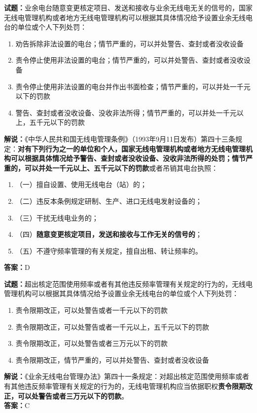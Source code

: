 \documentclass{ctexbook}
\begin{document}
\noindent\textbf{试题：}业余电台随意变更核定项目、发送和接收与业余无线电无关的信号的，国家无线电管理机构或者地方无线电管理机构可以根据其具体情况给予设置业余无线电台的单位或个人下列处罚：
\begin{enumerate}[leftmargin=3em]
  \item 劝告拆除非法设置的电台；情节严重的，可以并处警告、查封或者没收设备
  \item 责令停止使用非法设置的电台；情节严重的，可以并处警告、查封或者没收设备
  \item 责令停止使用非法设置的电台并作出书面检查；情节严重的，可以并处一千元以下的罚款
  \item 警告、查封或者没收设备、没收非法所得；情节严重的，可以并处一千元以上，五千元以下的罚款
\end{enumerate}
\noindent\textbf{解说：}《中华人民共和国无线电管理条例》（1993年9月11日发布）第四十三条规定：\textbf{对有下列行为之一的单位和个人，国家无线电管理机构或者地方无线电管理机构可以根据具体情况给予警告、查封或者没收设备、没收非法所得的处罚；情节严重的，可以并处一千元以上、五千元以下的罚款}或者吊销其电台执照：
\begin{enumerate}[leftmargin=3em, label=]
  \item（一）擅自设置、使用无线电台（站）的；
  \item（二）违反本条例规定研制、生产、进口无线电发射设备的；
  \item（三）干扰无线电业务的；
  \item（四）\textbf{随意变更核定项目，发送和接收与工作无关的信号的}；
  \item（五）不遵守频率管理的有关规定，擅自出租、转让频率的。
\end{enumerate}
\textbf{答案：}D

\bigskip

\noindent\textbf{试题：}超出核定范围使用频率或者有其他违反频率管理有关规定的行为的，无线电管理机构可以根据其具体情况给予设置业余无线电台的单位或个人下列处罚：
\begin{enumerate}[leftmargin=3em]
  \item 责令限期改正，可以处警告或者一千元以下的罚款
  \item 责令限期改正，可以处警告或者一千元以上，五千元以下的罚款
  \item 责令限期改正，可以处警告或者三万元以下的罚款
  \item 责令限期改正，情节严重的，可以并处警告、查封或者没收设备
\end{enumerate}
\noindent\textbf{解说：}《业余无线电台管理办法》第四十一条规定：对超出核定范围使用频率或者有其他违反频率管理有关规定的行为的，无线电管理机构应当依据职权\textbf{责令限期改正，可以处警告或者三万元以下的罚款}。\\\textbf{答案：}C
\end{document}

